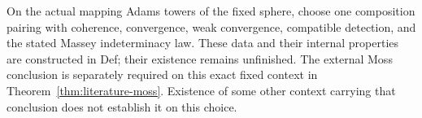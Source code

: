 \begin{definition}
  \label{def:fixed-sphere-moss-context}
  \notready
  On the actual mapping Adams towers of the fixed sphere, choose one
  composition pairing with coherence, convergence, weak convergence,
  compatible detection, and the stated Massey indeterminacy law.
  These data and their internal properties are constructed in Def;
  their existence remains unfinished. The external Moss conclusion is
  separately required on this exact fixed context in
  Theorem~\ref{thm:literature-moss}. Existence of some other context
  carrying that conclusion does not establish it on this choice.
\end{definition}

